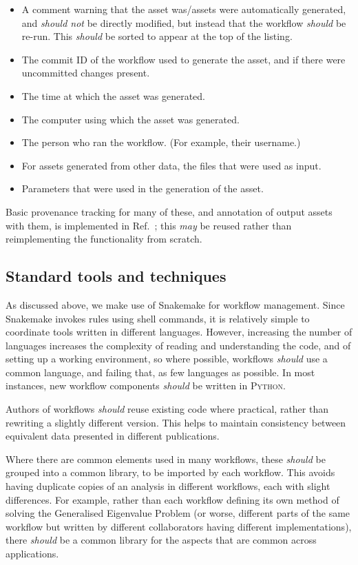 \documentclass{article}
\newcommand\rfcword[1]{\emph{#1}\xspace}
\newcommand\should{\rfcword{should}}
\newcommand\shouldnot{\rfcword{should not}}
\newcommand\may{\rfcword{may}}
\newcommand\program[1]{\textsc{#1}\xspace}
\begin{document}
\begin{itemize}
  \item
        A comment warning that the asset was/assets were automatically generated,
        and \shouldnot be directly modified,
        but instead that the workflow \should be re-run.
        This \should be sorted to appear at the top of the listing.
  \item
        The commit ID of the workflow used to generate the asset,
        and if there were uncommitted changes present.
  \item
        The time at which the asset was generated.
  \item
        The computer using which the asset was generated.
  \item
        The person who ran the workflow.
        (For example, their username.)
  \item
        For assets generated from other data,
        the files that were used as input.
  \item
        Parameters that were used in the generation of the asset.
\end{itemize}

Basic provenance tracking for many of these,
and annotation of output assets with them,
is implemented in Ref.~\cite{bennett_2024_13819431};
this \may be reused rather than reimplementing the functionality from scratch.

\subsection{Standard tools and techniques}

As discussed above,
we make use of Snakemake for workflow management.
Since Snakemake invokes rules using shell commands,
it is relatively simple to coordinate tools written in different languages.
However,
increasing the number of languages increases the complexity of reading and understanding the code,
and of setting up a working environment,
so where possible,
workflows \should use a common language,
and failing that,
as few languages as possible.
In most instances,
new workflow components \should be written in \program{Python}.

Authors of workflows \should reuse existing code where practical,
rather than rewriting a slightly different version.
This helps to maintain consistency between equivalent data presented in different publications.

Where there are common elements used in many workflows,
these \should be grouped into a common library,
to be imported by each workflow.
This avoids having duplicate copies of an analysis in different workflows,
each with slight differences.
For example,
rather than each workflow defining its own method of
solving the Generalised Eigenvalue Problem
(or worse,
different parts of the same workflow but written by different collaborators
having different implementations),
there \should be a common library for the aspects that are common across applications.
\end{document}
